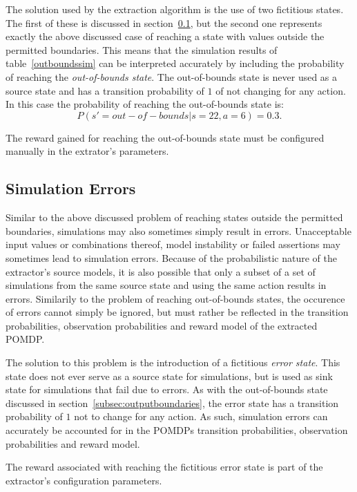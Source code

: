 The solution used by the extraction algorithm is the use of two fictitious states. The first of these is discussed in section~\ref{subsec:simerrors}, but the second one represents exactly the above discussed case of reaching a state with values outside the permitted boundaries. This means that the simulation results of table~\ref{outboundssim} can be interpreted accurately by including the probability of reaching the \textit{out-of-bounds state}. The out-of-bounds state is never used as a source state and has a transition probability of $1$ of not changing for any action. In this case the probability of reaching the out-of-bounds state is:
\[
P(s' = out-of-bounds|s=22,a=6) = 0.3.
\]

The reward gained for reaching the out-of-bounds state must be configured manually in the extrator's parameters.


\subsection{Simulation Errors}
\label{subsec:simerrors}

Similar to the above discussed problem of reaching states outside the permitted boundaries, simulations may also sometimes simply result in errors. Unacceptable input values or combinations thereof, model instability or failed assertions may sometimes lead to simulation errors. Because of the probabilistic nature of the extractor's source models, it is also possible that only a subset of a set of simulations from the same source state and using the same action results in errors. Similarily to the problem of reaching out-of-bounds states, the occurence of errors cannot simply be ignored, but must rather be reflected in the transition probabilities, observation probabilities and reward model of the extracted POMDP.

The solution to this problem is the introduction of a fictitious \textit{error state}. This state does not ever serve as a source state for simulations, but is used as sink state for simulations that fail due to errors. As with the out-of-bounds state discussed in section~\ref{subsec:outputboundaries}, the error state has a transition probability of $1$ not to change for any action. As such, simulation errors can accurately be accounted for in the POMDPs transition probabilities, observation probabilities and reward model.

The reward associated with reaching the fictitious error state is part of the extractor's configuration parameters.

